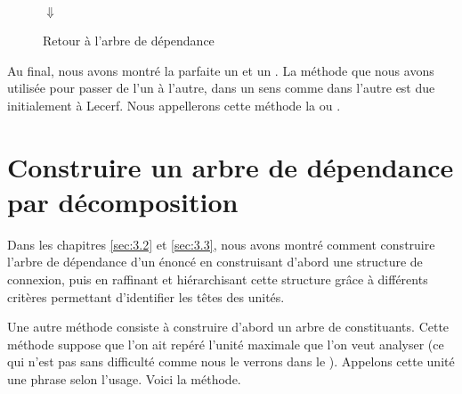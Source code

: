 \begin{figure}
{}%
\smallskip\\
{\huge$\Downarrow$}
\medskip\\
\caption{\label{fig:laponie-lecerf}Retour à l’arbre de dépendance}
\end{figure}


Au final, nous avons montré la parfaite  un  et un . La méthode que nous avons utilisée pour passer de l’un à l’autre, dans un sens comme dans l’autre est due initialement à Lecerf. Nous appellerons cette méthode la  ou .

\section{ Construire un arbre de dépendance par décomposition}\label{sec:3.4.6}

Dans les chapitres \ref{sec:3.2} et \ref{sec:3.3}, nous avons montré comment construire l’arbre de dépendance d’un énoncé en construisant d’abord une structure de connexion, puis en raffinant et hiérarchisant cette structure grâce à différents critères permettant d’identifier les têtes des unités.\pagebreak

Une autre méthode consiste à construire d’abord un arbre de constituants. Cette méthode suppose que l’on ait repéré l’unité maximale que l’on veut analyser (ce qui n'est pas sans difficulté comme nous le verrons dans le ). Appelons cette unité une phrase selon l’usage. Voici la méthode.\largerpage

